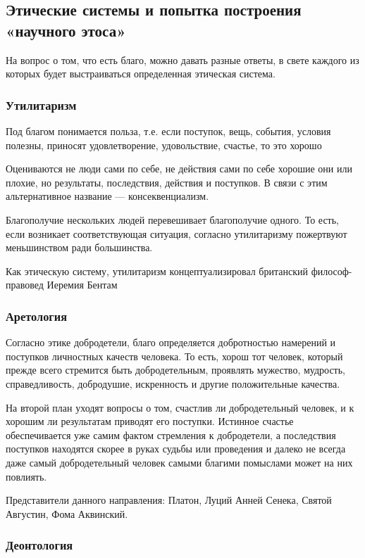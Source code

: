 \subsection{Этические системы и попытка построения «научного этоса»}

На вопрос о том, что есть благо, можно давать разные ответы, в свете каждого из которых
будет выстраиваться определенная этическая система. 

\subsubsection{Утилитаризм}
Под благом понимается польза, т.е. если поступок, вещь, события, условия полезны, приносят удовлетворение, удовольствие, счастье, то это хорошо

Оцениваются не люди сами по себе, не
действия сами по себе хорошие они или плохие, но результаты, последствия,
действия и поступков. В связи с этим альтернативное название --- консеквенциализм.

Благополучие нескольких людей перевешивает благополучие одного. То есть, если возникает соответствующая ситуация, согласно утилитаризму пожертвуют меньшинством ради большинства.

Как этическую систему, утилитаризм концептуализировал британский
философ-правовед Иеремия Бентам 

\subsubsection{Аретология}

Согласно этике добродетели, благо определяется добротностью намерений и поступков личностных
качеств человека. То есть, хорош тот человек, который прежде всего стремится
быть добродетельным, проявлять мужество, мудрость, справедливость, добродушие,
искренность и другие положительные качества. 

На второй план уходят вопросы о том, счастлив ли добродетельный человек, и к хорошим ли результатам приводят его поступки. Истинное счастье обеспечивается уже самим фактом стремления к добродетели, а последствия поступков находятся скорее в руках судьбы или проведения и далеко не всегда даже самый добродетельный человек самыми благими помыслами может на них
повлиять.

Представители данного направления: Платон, Луций Анней Сенека, Святой Августин, Фома Аквинский. 

\subsubsection{Деонтология}

